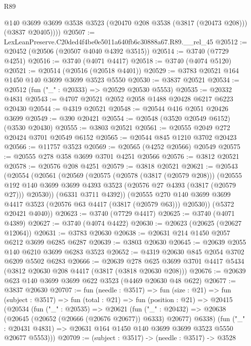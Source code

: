 \begin{lexlean}{R89}
\begin{coremodule}
          @140
          @3699
          @3699
          @3538
          @3523
          (@20470 @208 @3538 (@3817 (@20473 @208)))
          (@3837 @20405))))
@20507 := LexLeanPreserve.C20ded4f4be0e5011a640fb6c30888a67.R89.__rel_45
@20512 := @20452 (@20506 (@20507 @4040 @4392 @3515))
@20514 := @3740 (@7729 @4251)
@20516 := @3740 (@4071 @4417)
@20518 := @3740 (@4074 @5120)
@20521 := @20514 (@20516 (@20518 @4401))
@20529 := @3783 @20521 @164 @1450 @140 @3699 @3699 @3523 @5550
@20530 := @3837 @20521
@20534 := @20512 (fun ("_" : @20333) => @20529 @20530 @5553)
@20535 := @20332 @4831
@20543 := @4707 @20521 @2052 @2058 @1488 @20428 @6217 @6223 @20430
@20544 := @4319 @20521
@20548 := @20544 @416 @2051 @20426 @3699
@20549 := @390 @20421
@20554 := @20548 (@3520 @20549 @6152) (@3530 @20430)
@20555 := @3803 @20521
@20561 := @20555 @2049 @272 @20424 @3701 @20549 @6152
@20565 := @20544 @845 @1210 @3702 @20423
@20566 := @11757 @3523
@20569 := @20565 (@4252 @20566) @20549
@20575 := @20555 @278 @358 @3699 @3701 @4251 @20566
@20576 := @3812 @20521
@20578 := @20576 @208 @4251
@20579 := @3818 @20521
@20621 := @20543
    (@20554
      (@20561
        (@20569
          (@20575
            (@20578 (@3817 (@20579 @208)))
            (@20555
              @192
              @140
              @3699
              @3699
              @4393
              @3523
              (@20576 @27 @4393 (@3817 (@20579 @27)))
              @20530))
          (@6331 @3711 @4392))
        (@20555 @270 @140 @3699 @3699 @4417 @3523 (@20576 @63 @4417 (@3817 (@20579 @63))) @20530))
      (@5372 @20421 @4040))
@20623 := @3740 (@7729 @4417)
@20625 := @3740 (@4071 @4389)
@20627 := @3740 (@4074 @4422)
@20630 := @20623 (@20625 (@20627 @12064))
@20631 := @3783 @20630
@20638 := @20631 @214 @1450 @2057 @6212 @3699 @6285 @6287
@20639 := @3803 @20630
@20645 := @20639 @2055 @140 @6210 @3699 @6283 @3523
@20652 := @4319 @20630 @845 @2054 @3702 @6209 @5502 @6283
@20666 := @20639
    @278
    @625
    @3699
    @3701
    @4417
    @5434
    (@3812 @20630 @208 @4417 (@3817 (@3818 @20630 @208)))
@20676 := @20639 @623 @140 @3699 @3699 @622 @3523 (@4469 @20630 @48 @622)
@20677 := @3837 @20630
@20707 := fun (needle : @3517) =>
  fun (size : @21) =>
  fun (subject : @3517) =>
  fun (total : @21) =>
  fun (position : @21) =>
  @20415
    (@20534
      (fun ("_" : @20535) =>
      @20621
        (fun ("_" : @20432) => @20638 (@20645 (@20652 (@20666 (@20676 @20677)) @6333) @20677) @6338)
        (fun ("_" : @20431 @4831) => @20631 @164 @1450 @140 @3699 @3699 @3523 @5550 @20677 @5553)))
@20709 := (subject : @3517) -> (needle : @3517) -> @3528

\end{coremodule}
\end{lexlean}

